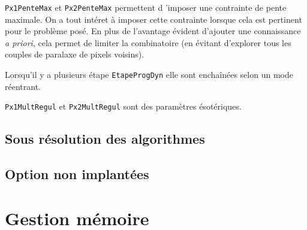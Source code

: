 {\tt Px1PenteMax} et {\tt Px2PenteMax} permettent d 'imposer une contrainte
de pente maximale. On a tout int\'eret \`a imposer cette contrainte lorsque
cela est pertinent pour le probl\`eme pos\'e. En plus de l'avantage
\'evident d'ajouter une connaissance \emph{a priori}, cela permet
de limiter la combinatoire (en \'evitant d'explorer tous les couples
de paralaxe de pixels voisins).

Lorsqu'il y a plusieurs \'etape {\tt EtapeProgDyn} elle sont
encha\^in\'ees selon un mode r\'eentrant.


{\tt Px1MultRegul} et {\tt Px2MultRegul} sont des param\`etres \'esot\'eriques.



\subsection{Sous r\'esolution des algorithmes}

\subsection{Option non implant\'ees}



\section{Gestion m\'emoire}


